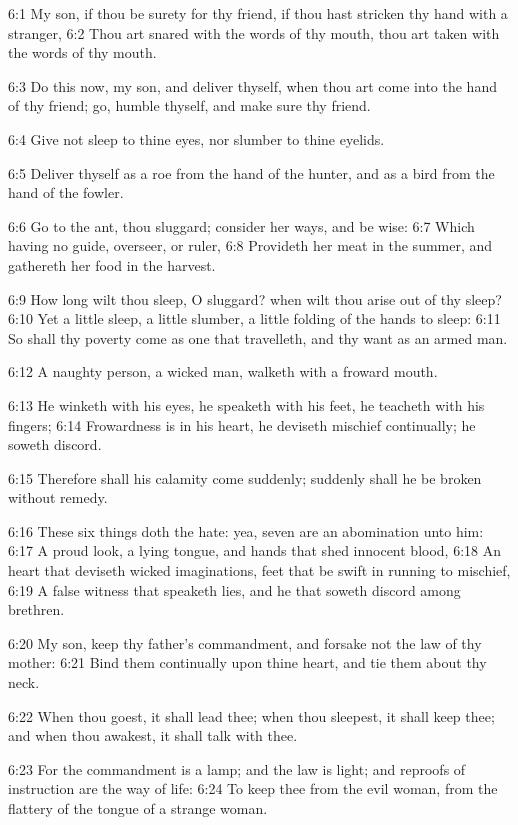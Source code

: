 6:1 My son, if thou be surety for thy friend, if thou hast stricken thy hand with a stranger, 6:2 Thou art snared with the words of thy mouth, thou art taken with the words of thy mouth.

6:3 Do this now, my son, and deliver thyself, when thou art come into the hand of thy friend; go, humble thyself, and make sure thy friend.

6:4 Give not sleep to thine eyes, nor slumber to thine eyelids.

6:5 Deliver thyself as a roe from the hand of the hunter, and as a bird from the hand of the fowler.

6:6 Go to the ant, thou sluggard; consider her ways, and be wise: 6:7 Which having no guide, overseer, or ruler, 6:8 Provideth her meat in the summer, and gathereth her food in the harvest.

6:9 How long wilt thou sleep, O sluggard? when wilt thou arise out of thy sleep?  6:10 Yet a little sleep, a little slumber, a little folding of the hands to sleep: 6:11 So shall thy poverty come as one that travelleth, and thy want as an armed man.

6:12 A naughty person, a wicked man, walketh with a froward mouth.

6:13 He winketh with his eyes, he speaketh with his feet, he teacheth with his fingers; 6:14 Frowardness is in his heart, he deviseth mischief continually; he soweth discord.

6:15 Therefore shall his calamity come suddenly; suddenly shall he be broken without remedy.

6:16 These six things doth the \LORD hate: yea, seven are an abomination unto him: 6:17 A proud look, a lying tongue, and hands that shed innocent blood, 6:18 An heart that deviseth wicked imaginations, feet that be swift in running to mischief, 6:19 A false witness that speaketh lies, and he that soweth discord among brethren.

6:20 My son, keep thy father's commandment, and forsake not the law of thy mother: 6:21 Bind them continually upon thine heart, and tie them about thy neck.

6:22 When thou goest, it shall lead thee; when thou sleepest, it shall keep thee; and when thou awakest, it shall talk with thee.

6:23 For the commandment is a lamp; and the law is light; and reproofs of instruction are the way of life: 6:24 To keep thee from the evil woman, from the flattery of the tongue of a strange woman.

